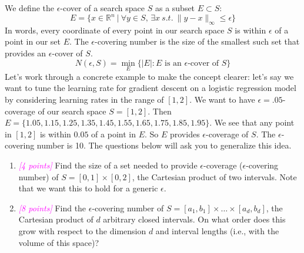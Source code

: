 \documentclass{exam}
\newcommand{\grade}[1]{\small\textcolor{magenta}{\emph{[#1 points]}} \normalsize}
\begin{document}
We define the $\epsilon$-cover of a search space $S$ as a subset $E \subset S$:
\[ 
    E = \{x \in \mathbb{R}^n\ |\ \forall y \in S,\,\exists x\ s.t.\ \|y-x\|_\infty \leq \epsilon\}
\]
In words, every coordinate of every point in our search space $S$ is within $\epsilon$ of a point in our set $E$. %
The $\epsilon$-covering number is the size of the smallest such set that provides an $\epsilon$-cover of $S$.
\[
    N(\epsilon, S) = \min_E \{|E|  : E \textrm{ is an } \epsilon\textrm{-cover of } S\}
\]
Let's work through a concrete example to make the concept clearer: let's say we want to tune the learning rate for gradient descent on a logistic regression model by considering learning rates in the range of $[1,2]$. We want to have $\epsilon=.05$-coverage of our search space $S = [1,2]$. Then $E = \{1.05, 1.15, 1.25, 1.35, 1.45, 1.55, 1.65, 1.75, 1.85, 1.95\}$. We see that any point in $[1,2]$ is within $0.05$ of a point in $E$. So $E$ provides $\epsilon$-coverage of $S$. The $\epsilon$-covering number is 10. The questions below will ask you to generalize this idea.
\begin{enumerate}[label=(\alph*)]
    \item \grade{4} Find the size of a set needed to provide $\epsilon$-coverage ($\epsilon$-covering number) of $S = [0,1]\times[0,2]$, the Cartesian product of two intervals. Note that we want this to hold for a generic $\epsilon$.
    
    \vspace{2in}
    \item \grade{8} Find the $\epsilon$-covering number of $S = [a_1, b_1] \times \ldots \times [a_d, b_d]$, the Cartesian product of $d$ arbitrary closed intervals. On what order does this grow with respect to the dimension $d$ and interval lengths (i.e., with the volume of this space)?
\end{enumerate}

\clearpage
\end{document}
